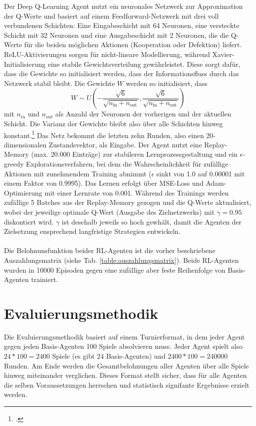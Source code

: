 Der Deep Q-Learning Agent nutzt ein neuronales Netzwerk zur Approximation der Q-Werte und basiert auf einem 
Feedforward-Netzwerk mit drei voll verbundenen Schichten: Eine Eingabeschicht mit 64 Neuronen, eine versteckte 
Schicht mit 32 Neuronen und eine Ausgabeschicht mit 2 Neuronen, die die Q-Werte für die beiden möglichen Aktionen 
(Kooperation oder Defektion) liefert. ReLU-Aktivierungen sorgen für nicht-lineare Modellierung, während Xavier-Initialisierung 
eine stabile Gewichtsverteilung gewährleistet. Diese sorgt dafür, dass die Gewichte so initialisiert werden, dass der 
Informationsfluss durch das Netzwerk stabil bleibt. Die Gewichte $W$ werden so initialisiert, dass
\begin{equation}
    W \sim U \left( -\frac{\sqrt{6}}{\sqrt{n_{\text{in}}+n_{\text{out}}}}, \frac{\sqrt{6}}{\sqrt{n_{\text{in}}+n_{\text{out}}}} \right)
\end{equation}
mit $n_{in}$ und $n_{out}$ als Anzahl der Neuronen der vorherigen und der aktuellen Schicht. Die Varianz der Gewichte bleibt
also über alle Schichten hinweg konstant.\footcite{pmlr-v9-glorot10a}
Das Netz bekommt die letzten zehn Runden, also einen 20-dimensionalen 
Zustandsvektor, als Eingabe. Der Agent nutzt eine Replay-Memory (max. 20.000 Einträge) zur stabileren 
Lernprozessgestaltung und ein $\epsilon$-greedy Explorationsverfahren, bei dem die Wahrscheinlichkeit für zufällige Aktionen mit 
zunehmendem Training abnimmt ($\epsilon$ sinkt von 1.0 auf 0.00001 mit einem Faktor von 0.9995). Das Lernen erfolgt über MSE-Loss und Adam-Optimierung mit 
einer Lernrate von 0.001.
Während des Trainings werden zufällige 5 Batches aus der Replay-Memory gezogen und die Q-Werte 
aktualisiert, wobei der jeweilige optimale Q-Wert (Ausgabe des Zielnetzwerks) mit $\gamma=0.95$ diskontiert wird. $\gamma$ ist desehalb jeweils
so hoch gewhält, damit die Agenten der Zielsetzung ensprechend langfristige Strategien entwickeln.\\ \\
Die Belohnunsfunktion beider RL-Agenten ist die vorher beschriebene Auszahlungsmatrix (siehe Tab. \ref{table:auszahlungsmatrix}).
Beide RL-Agenten wurden in 10000 Episoden gegen eine zufällige aber feste Reihenfolge von Basis-Agenten trainiert.


\section{Evaluierungsmethodik}
Die Evaluierungsmethodik basiert auf einem Turnierformat, in dem jeder Agent gegen jeden Basis-Agenten 100 Spiele 
absolvieren muss. Jeder Agent spielt also $24 * 100 = 2400$ Spiele (es gibt 24 Basis-Agenten) und $2400 * 100 = 240000$ Runden. 
Am Ende werden die Gesamtbelohnungen aller Agenten über alle Spiele hinweg miteinander verglichen.
Dieses Format stellt sicher, dass für alle Agenten die selben Voraussetzungen herrschen und statistisch signifante Ergebnisse erzielt werden.

